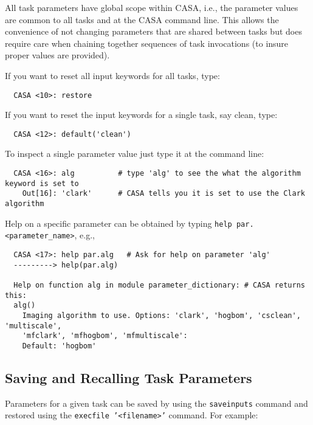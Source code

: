 All task parameters have global scope within CASA, i.e., the
parameter values are common to all tasks and at the CASA command
line. This allows the convenience of not changing parameters that are
shared between tasks but does require care when chaining together
sequences of task invocations (to insure proper values are provided).

If you want to reset all input keywords for all tasks, type:

\small
\begin{verbatim}
  CASA <10>: restore
\end{verbatim}
\normalsize

If you want to reset the input keywords for a single task, say clean, type:

\small
\begin{verbatim}
  CASA <12>: default('clean')
\end{verbatim}
\normalsize

To inspect a single parameter value just type it at the command line:
\small
\begin{verbatim}
  CASA <16>: alg          # type 'alg' to see the what the algorithm keyword is set to
    Out[16]: 'clark'      # CASA tells you it is set to use the Clark algorithm
\end{verbatim}
\normalsize

Help on a specific parameter can be obtained by typing 
{\tt help par.<parameter\_name>}, e.g.,

\small
\begin{verbatim}
  CASA <17>: help par.alg   # Ask for help on parameter 'alg'
  ---------> help(par.alg)

  Help on function alg in module parameter_dictionary: # CASA returns this: 
  alg()
    Imaging algorithm to use. Options: 'clark', 'hogbom', 'csclean', 'multiscale',
    'mfclark', 'mfhogbom', 'mfmultiscale':
    Default: 'hogbom'
\end{verbatim}
\normalsize


\subsection{Saving and Recalling Task Parameters}
\label{section:intro.tasks.parms}

Parameters for a given task can be saved by using the {\tt saveinputs}
command and restored using the {\tt execfile '<filename>'} command.  For
example:

